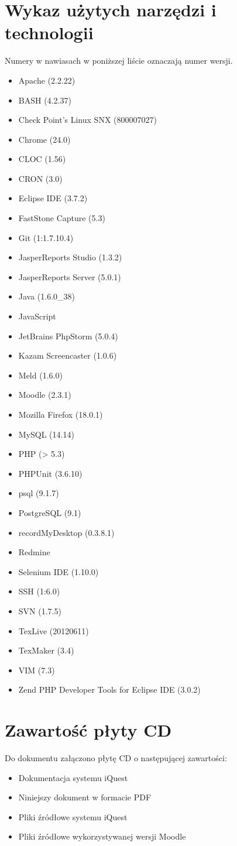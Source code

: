 \section{Wykaz użytych narzędzi i technologii}
\label{ChapterA4}

Numery w nawiasach w poniższej liście oznaczają numer wersji.

\begin{itemize}
\item Apache (2.2.22)
\item BASH (4.2.37)
\item Check Point's Linux SNX (800007027)
\item Chrome (24.0)
\item CLOC (1.56)
\item CRON (3.0)
\item Eclipse IDE (3.7.2)
\item FastStone Capture (5.3)
\item Git (1:1.7.10.4)
\item JasperReports Studio (1.3.2)
\item JasperReports Server (5.0.1)
\item Java (1.6.0\_38)
\item JavaScript
\item JetBrains PhpStorm (5.0.4)
\item Kazam Screencaster (1.0.6)
\item Meld (1.6.0)
\item Moodle (2.3.1)
\item Mozilla Firefox (18.0.1)
\item MySQL (14.14)
\item PHP (> 5.3)
\item PHPUnit (3.6.10)
\item psql (9.1.7)
\item PostgreSQL (9.1)
\item recordMyDesktop (0.3.8.1)
\item Redmine
\item Selenium IDE (1.10.0)
\item SSH (1:6.0)
\item SVN (1.7.5)
\item TexLive (20120611)
\item TexMaker (3.4)
\item VIM (7.3)
\item Zend PHP Developer Tools for Eclipse IDE (3.0.2)
\end{itemize}

\section{Zawartość płyty CD}

Do dokumentu załączono płytę CD o następującej zawartości:

\begin{itemize}
\item Dokumentacja systemu iQuest
\item Niniejszy dokument w formacie PDF
\item Pliki źródłowe systemu iQuest
\item Pliki źródłowe wykorzystywanej wersji Moodle
\end{itemize}